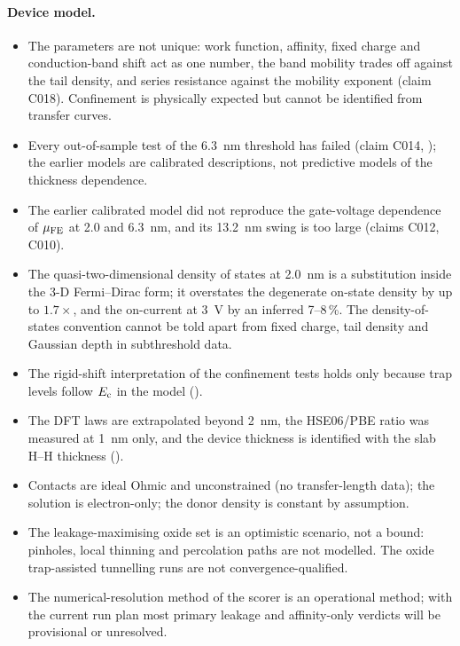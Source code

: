 \paragraph{Device model.}
\begin{itemize}
\item The parameters are not unique: work function, affinity, fixed charge and conduction-band shift act as one number,
the band mobility trades off against the tail density, and series resistance against the mobility exponent (claim
C018). Confinement is physically expected but cannot be identified from transfer curves. %
\item Every out-of-sample test of the \SI{6.3}{nm} threshold has failed (claim C014, ); the earlier
models are calibrated descriptions, not predictive models of the thickness dependence. %
\item The earlier calibrated model did not reproduce the gate-voltage dependence of $\mu_{\mathrm{FE}}$ at 2.0 and \SI{6.3}{nm}, and
its \SI{13.2}{nm} swing is too large (claims C012, C010). %
\item The quasi-two-dimensional density of states at \SI{2.0}{nm} is a substitution inside the 3-D Fermi--Dirac form; it
overstates the degenerate on-state density by up to $1.7\times$, and the on-current at \SI{3}{V} by an inferred
7--8\,\%. The density-of-states convention cannot be told apart from fixed charge, tail density and Gaussian depth in
subthreshold data. %
\item The rigid-shift interpretation of the confinement tests holds only because trap levels follow $E_{\mathrm{c}}$ in the model
(). %
\item The DFT laws are extrapolated beyond \SI{2}{nm}, the HSE06/PBE ratio was measured at \SI{1}{nm} only, and the
device thickness is identified with the slab H--H thickness (). %
\item Contacts are ideal Ohmic and unconstrained (no transfer-length data); the solution is electron-only; the donor
density is constant by assumption. %
\item The leakage-maximising oxide set is an optimistic scenario, not a bound: pinholes, local thinning and percolation
paths are not modelled. The oxide trap-assisted tunnelling runs are not convergence-qualified. %
\item The numerical-resolution method of the scorer is an  operational method; with the current run plan
most primary leakage and affinity-only verdicts will be provisional or unresolved. %
\end{itemize}

